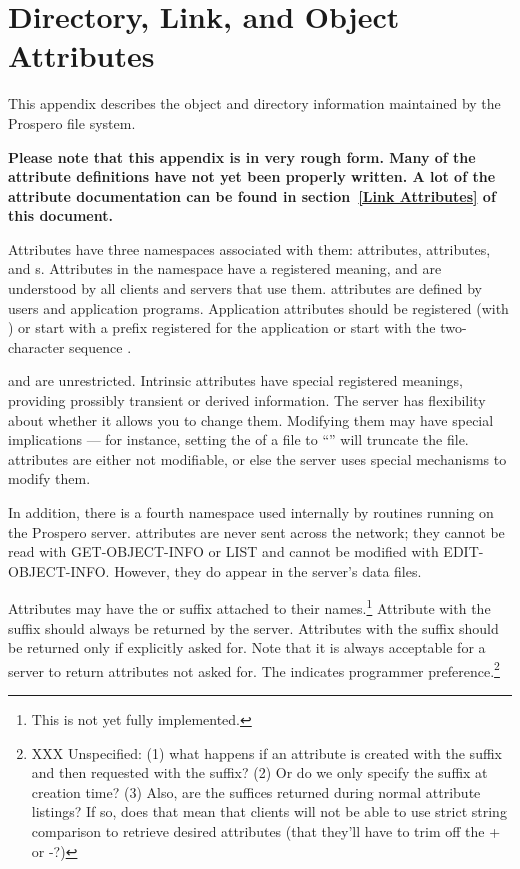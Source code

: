 \appendix

\chapter{Directory, Link, and Object Attributes\label{db}}

This appendix describes the object and directory information
maintained by the Prospero file system.

{\bf \large Please note that this appendix is in very rough
form.  Many of the attribute definitions have not yet been properly
written.  A lot of the attribute documentation can be found in
section~\ref{Link Attributes} of this document.}

Attributes have three namespaces
associated with them:  attributes, 
attributes, and s.
Attributes in the  namespace have a registered meaning, and
are understood by all clients and servers that use them.
 attributes are defined by users and application
programs.  Application attributes should be registered (with
) or start with a prefix registered for the
application or start with the two-character sequence .

 and are unrestricted.  Intrinsic attributes have special
registered meanings, providing prossibly transient or derived
information.  The server has flexibility about whether it allows you
to change them.  Modifying them may have special implications
--- for instance, setting the  of a file to 
``'' will truncate the file.   attributes
are either not modifiable, or else the server uses special mechanisms
to modify them.

In addition, there is a fourth namespace used internally by routines
running on the Prospero server.    attributes are never
sent across the network; they cannot be read with GET-OBJECT-INFO or
LIST and cannot be modified with EDIT-OBJECT-INFO.  However, they do
appear in the server's data files.

Attributes may have the \lit{+} or \lit{-} suffix attached to their 
names.\footnote{This is not yet fully implemented.}  Attribute
with the \lit{+} suffix should always be returned by the server.
Attributes with the \lit{-} suffix should be returned only if
explicitly asked for.  Note that it is always acceptable for a server
to return attributes not asked for.  The \lit{-} indicates programmer
preference.\footnote{XXX Unspecified: (1) what happens if an attribute is
created with the \lit{+} suffix and then requested with the \lit{-} 
suffix?  (2) Or do we only specify the suffix at creation time?  (3) Also, are
the suffices returned during normal attribute listings?   If so, does
that mean that clients will not be able to use strict string
comparison to retrieve desired attributes (that they'll have to trim
off the + or -?)}

